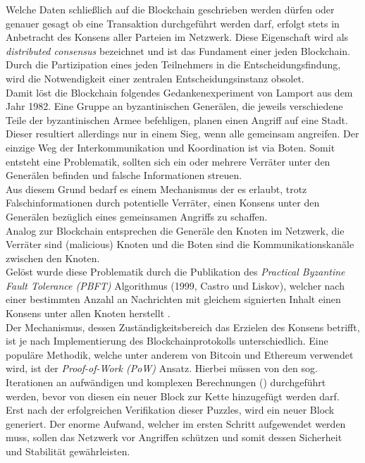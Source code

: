 Welche Daten schließlich auf die Blockchain geschrieben werden dürfen oder genauer gesagt ob eine Transaktion durchgeführt werden darf, erfolgt stets in Anbetracht des Konsens aller Parteien im Netzwerk. Diese Eigenschaft wird als \textit{distributed consensus} bezeichnet und ist das Fundament einer jeden Blockchain. Durch die Partizipation eines jeden Teilnehmers in die Entscheidungsfindung, wird die Notwendigkeit einer zentralen Entscheidungsinstanz obsolet. \\
Damit löst die Blockchain folgendes Gedankenexperiment von Lamport aus dem Jahr 1982. Eine Gruppe an byzantinischen Generälen, die jeweils verschiedene Teile der byzantinischen Armee befehligen, planen einen Angriff auf eine Stadt. Dieser resultiert allerdings nur in einem Sieg, wenn alle gemeinsam angreifen. Der einzige Weg der Interkommunikation und Koordination ist via Boten. Somit entsteht eine Problematik, sollten sich ein oder mehrere Verräter unter den Generälen befinden und falsche Informationen streuen.\\
Aus diesem Grund bedarf es einem Mechanismus der es erlaubt, trotz Falschinformationen durch potentielle Verräter, einen Konsens unter den Generälen bezüglich eines gemeinsamen Angriffs zu schaffen. \\
Analog zur Blockchain entsprechen die Generäle den Knoten im Netzwerk, die Verräter sind  (malicious) Knoten und die Boten sind die Kommunikationskanäle zwischen den Knoten.\\
Gelöst wurde diese Problematik durch die Publikation des \textit{Practical Byzantine Fault Tolerance (PBFT)} Algorithmus (1999, Castro und Liskov), welcher nach einer bestimmten Anzahl an Nachrichten mit gleichem signierten Inhalt einen Konsens unter allen Knoten herstellt \cite{MasteringBlockchain}.\\ 
Der Mechanismus, dessen Zuständigkeitsbereich das Erzielen des Konsens betrifft, ist je nach Implementierung des Blockchainprotokolls unterschiedlich. Eine populäre Methodik, welche unter anderem von Bitcoin und Ethereum verwendet wird, ist der \textit{Proof-of-Work (PoW)} Ansatz. Hierbei müssen von den sog.  Iterationen an aufwändigen und komplexen Berechnungen () durchgeführt werden, bevor von diesen ein neuer Block zur Kette hinzugefügt werden darf. Erst nach der erfolgreichen Verifikation dieser Puzzles, wird ein neuer Block generiert. Der enorme Aufwand, welcher im ersten Schritt aufgewendet werden muss, sollen das Netzwerk vor Angriffen schützen und somit dessen Sicherheit und Stabilität gewährleisten. \\
